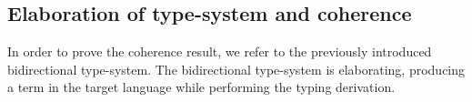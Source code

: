 %
%
%
%
%



\subsection{Elaboration of type-system and coherence} 
In order to prove the coherence result, we refer to the previously introduced bidirectional 
type-system.
The bidirectional type-system is elaborating, producing a term in the target language while
performing the typing derivation.

